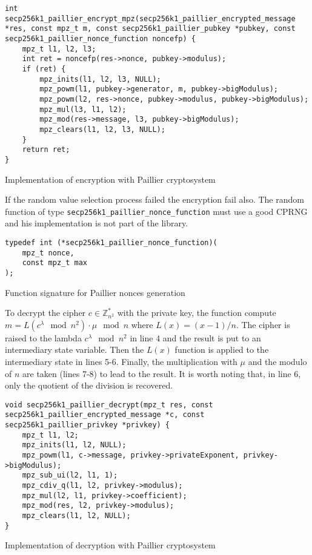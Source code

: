 \begin{listing}
  \begin{verbatim}
int secp256k1_paillier_encrypt_mpz(secp256k1_paillier_encrypted_message *res, const mpz_t m, const secp256k1_paillier_pubkey *pubkey, const secp256k1_paillier_nonce_function noncefp) {
    mpz_t l1, l2, l3;
    int ret = noncefp(res->nonce, pubkey->modulus);
    if (ret) {
        mpz_inits(l1, l2, l3, NULL);
        mpz_powm(l1, pubkey->generator, m, pubkey->bigModulus);
        mpz_powm(l2, res->nonce, pubkey->modulus, pubkey->bigModulus);
        mpz_mul(l3, l1, l2);
        mpz_mod(res->message, l3, pubkey->bigModulus);
        mpz_clears(l1, l2, l3, NULL);
    }
    return ret;
}
  \end{verbatim}
	\caption{Implementation of encryption with Paillier cryptosystem}
	\label{lst:implEncryptPaillier}
\end{listing}

If the random value selection process failed the encryption fail also. The
random function of type \texttt{secp256k1\_paillier\_nonce\_function} must use a
good CPRNG and his implementation is not part of the library.

\begin{listing}
  \begin{verbatim}
typedef int (*secp256k1_paillier_nonce_function)(
    mpz_t nonce,
    const mpz_t max
);
  \end{verbatim}
	\caption{Function signature for Paillier nonces generation}
	\label{lst:PaillierNoncesSigFunc}
\end{listing}

To decrypt the cipher $c \in \mathbb{Z}_{n^2}^*$ with the private key, the
function compute $m = L(c^{\lambda} \mod n^2) \cdot \mu \mod n$ where $L(x) = (x -
1) / n$. The cipher is raised to the lambda $c^{\lambda} \mod n^2$ in line 4 and
the result is put to an intermediary state variable. Then the $L(x)$ function is
applied to the intermediary state in lines 5-6. Finally, the multiplication with
$\mu$ and the modulo of $n$ are taken (lines 7-8) to lead to the result. It is
worth noting that, in line 6, only the quotient of the division is recovered.

\begin{listing}
  \begin{verbatim}
void secp256k1_paillier_decrypt(mpz_t res, const secp256k1_paillier_encrypted_message *c, const secp256k1_paillier_privkey *privkey) {
    mpz_t l1, l2;
    mpz_inits(l1, l2, NULL);
    mpz_powm(l1, c->message, privkey->privateExponent, privkey->bigModulus);
    mpz_sub_ui(l2, l1, 1);
    mpz_cdiv_q(l1, l2, privkey->modulus);
    mpz_mul(l2, l1, privkey->coefficient);
    mpz_mod(res, l2, privkey->modulus);
    mpz_clears(l1, l2, NULL);
}
  \end{verbatim}
	\caption{Implementation of decryption with Paillier cryptosystem}
	\label{lst:implDecryptPaillier}
\end{listing}

